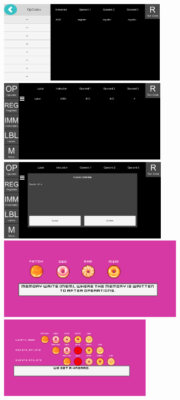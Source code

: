 \documentclass[12pt]{article}
\begin{document}
	\includegraphics[height=4cm]{MIPSSimulatorProgress.png}\\
	\includegraphics[height=4cm]{MIPSSimulatorReady.png}
	\includegraphics[height=4cm]{MIPSSimulatorRun.png}\\
	\includegraphics[height=4cm]{PipelineBakeryTut.png}
	\includegraphics[height=4cm]{PipelineBakeryTut2.png}\\
\end{document}
